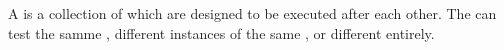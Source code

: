 \item[Test Job]{
A \gdjob{} is a collection of \gdsuites{} which are designed to be executed after each other. The \gdsuites{} can test the samme \gdaut{}, different instances of the same \gdaut{}, or different \gdauts{} entirely.
}
